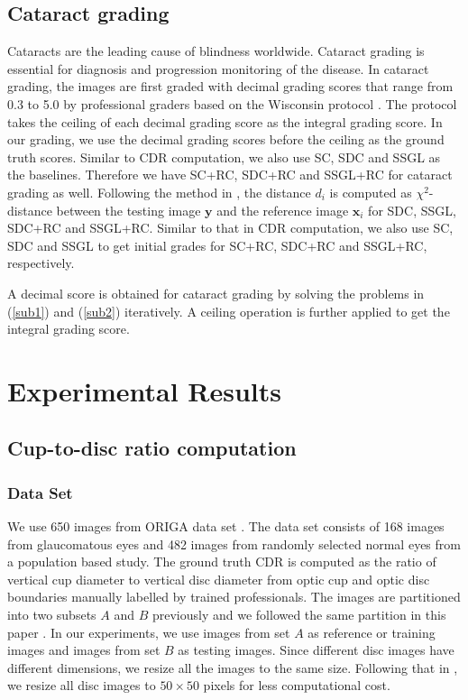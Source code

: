 \documentclass[journal]{IEEEtran}
\begin{document}
\subsection{Cataract grading}
 Cataracts are the leading cause of   blindness worldwide. Cataract grading  is essential for diagnosis and progression monitoring of the disease. In cataract grading, the images are first graded with decimal grading scores that
 range from 0.3  to 5.0 by professional graders based on
 the Wisconsin protocol \cite{Klein1990}.   The protocol takes the ceiling of each decimal grading score as the integral grading score.
 In our grading, we use the decimal grading scores before the ceiling as the ground truth scores.
 Similar to CDR computation, we also use SC, SDC and SSGL as the baselines.
 Therefore we have SC+RC, SDC+RC and SSGL+RC for cataract grading as well.
 Following the method in \cite{Xu13}, the distance $d_i$ is computed as $ \chi^2$-distance between the testing image $\textbf{y}$ and the reference image $\textbf{x}_i$ for SDC, SSGL, SDC+RC and SSGL+RC.
  Similar to that in CDR computation, we also use SC, SDC and SSGL to get initial grades for SC+RC, SDC+RC and SSGL+RC, respectively.

A decimal score is obtained for cataract grading by solving the problems in (\ref{sub1}) and (\ref{sub2}) iteratively. A ceiling operation is further applied to get the integral grading score.


\section{Experimental
Results} \label{Exp}
\subsection{Cup-to-disc ratio computation}



\subsubsection{Data Set}
We use 650 images from ORIGA data set \cite{origa}. The data set
consists of 168 images from glaucomatous eyes and 482 images from
randomly selected normal eyes from a population based study.
The ground truth CDR is computed as the ratio of vertical cup diameter to vertical disc diameter from optic cup and optic disc boundaries manually labelled by trained professionals.
The images are partitioned into two subsets $A$ and $B$ previously and we followed the same partition in this paper \cite{Cheng:17BOE}. In our experiments, we use images from set $A$ as reference or training images and images from set $B$ as testing images.
  Since different disc images have different dimensions, we resize all the images to  the same size. Following that in \cite{CJ15}, we resize all disc images to $50\times 50$ pixels for less computational cost.
\end{document}
